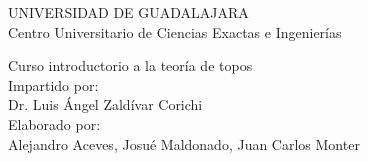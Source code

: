 \begin{titlepage}
\begin{center}
      {\Huge{UNIVERSIDAD DE GUADALAJARA}}\\
    \vspace{1 cm}
    {\Large{Centro Universitario de Ciencias Exactas e Ingenierías}}
\end{center}
    \vspace*{\fill} 
    \centering
    {\Huge Curso introductorio a la teoría de topos}\\
    \vspace{0.5cm}
    Impartido por:\\
    \vspace{0.5cm}
    {\large  Dr. Luis Ángel Zaldívar Corichi}\\
    \vspace{0.5cm}
    Elaborado por: \\
    \vspace{.5 cm}
    {\large{Alejandro Aceves, Josué  Maldonado,  Juan Carlos Monter} }
    
    \vspace{0.5cm}
    
    \vspace*{\fill} %
\end{titlepage}